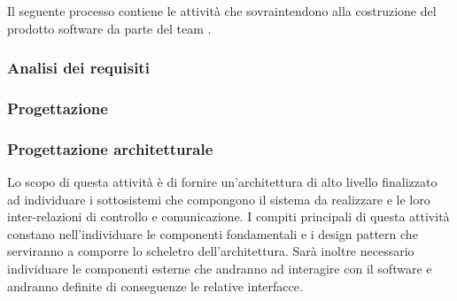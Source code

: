 Il seguente processo contiene le attività che sovraintendono alla costruzione del prodotto software da parte del team \GRUPPO. 

\subsubsection{Analisi dei requisiti}


\newpage
\subsubsection{Progettazione}


\newpage
\subsubsection{Progettazione architetturale}
Lo scopo di questa attività è di fornire un'architettura di alto livello finalizzato ad individuare i sottosistemi che compongono il sistema da realizzare e le loro inter-relazioni di controllo e comunicazione. I compiti principali di questa attività constano nell'individuare le componenti fondamentali e i \gls{design pattern} che serviranno a comporre lo scheletro dell'architettura. Sarà inoltre necessario individuare le componenti esterne che andranno ad interagire con il software e andranno definite di conseguenze le relative interfacce.
